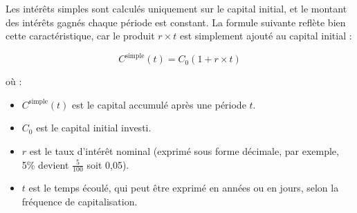 \documentclass{article}
\begin{document}
\begin{tcolorbox}[
        colback=lightgreen, 
        colframe=lightgreen, 
        boxrule=0.5pt, 
        arc=0pt, 
        left=10pt, 
        right=10pt, 
        top=6pt, 
        bottom=6pt, 
        boxsep=2pt, 
        before upper={\faLightbulb\hspace{10pt}}
    ]
        Les intérêts simples sont calculés uniquement sur le capital initial, et le montant des intérêts gagnés chaque période est constant. La formule suivante reflète bien cette caractéristique, car le produit \( r \times t \) est simplement ajouté au capital initial :

        \[
        C^{\text{simple}}(t) = C_0 \left(1 + r \times t\right)
        \]
        
        où :
        \begin{itemize}
            \item \( C^{\text{simple}}(t) \) est le capital accumulé après une période \( t \).
            \item \( C_0 \) est le capital initial investi.
            \item \( r \) est le taux d'intérêt nominal (exprimé sous forme décimale, par exemple, 5\% devient $\frac{5}{100}$ soit 0,05).
            \item \( t \) est le temps écoulé, qui peut être exprimé en années ou en jours, selon la fréquence de capitalisation.
        \end{itemize}
    \end{tcolorbox}
\end{document}
